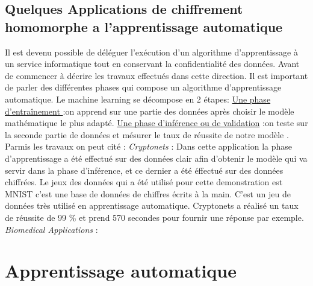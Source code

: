 \documentclass[a4paper,12pt]{report}
\begin{document}
\subsection{Quelques Applications de chiffrement homomorphe a l'apprentissage automatique}
Il est devenu possible de déléguer l'exécution d'un algorithme d'apprentissage à un service informatique tout en conservant la confidentialité des données. \newline
Avant de commencer à décrire les travaux effectués dans cette direction. Il est important de parler des différentes phases qui compose un algorithme d'apprentissage automatique.\newline
Le machine learning se décompose en 2 étapes:\newline
\underline{Une phase d’entraînement }:\newline on apprend sur une partie des données après choisir le modèle mathématique le plus adapté.\newline 
\underline{Une phase d'inférence ou de validation} :\newline	 on teste sur la seconde partie de données et mésurer le taux de réussite de notre modèle .\newline
Parmis les travaux on peut cité :\newline
\textit{Cryptonets } :  \newline
Dans cette application la phase d'apprentissage a été effectué sur des données clair  afin d'obtenir le modèle qui va servir dans la phase d'inférence, et ce dernier a été éffectué sur des données chiffrées.\newline
Le jeux des données qui a été utilisé pour cette demonstration est MNIST c'est une base de données de chiffres écrits à la main. C'est un jeu de données très utilisé en apprentissage automatique.\newline
Cryptonets a réalisé un taux de réussite de 99 \% et prend 570 secondes pour fournir une réponse par exemple.\newline
\textit{Biomedical Applications } :
\newpage
\newpage
\section{Apprentissage automatique}
\end{document}

